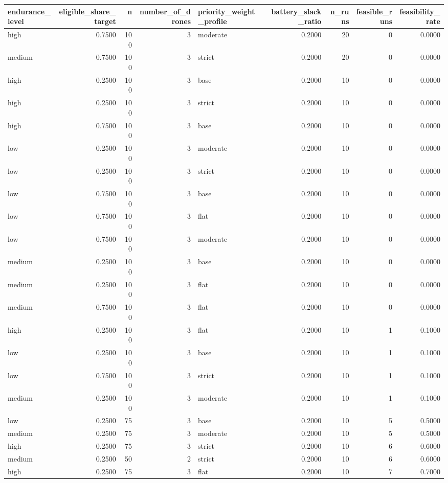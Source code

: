 \begin{tabular}{lrrrlrrrr}
\toprule
endurance_level & eligible_share_target & n & number_of_drones & priority_weight_profile & battery_slack_ratio & n_runs & feasible_runs & feasibility_rate \\
\midrule
high & 0.7500 & 100 & 3 & moderate & 0.2000 & 20 & 0 & 0.0000 \\
medium & 0.7500 & 100 & 3 & strict & 0.2000 & 20 & 0 & 0.0000 \\
high & 0.2500 & 100 & 3 & base & 0.2000 & 10 & 0 & 0.0000 \\
high & 0.2500 & 100 & 3 & strict & 0.2000 & 10 & 0 & 0.0000 \\
high & 0.7500 & 100 & 3 & base & 0.2000 & 10 & 0 & 0.0000 \\
low & 0.2500 & 100 & 3 & moderate & 0.2000 & 10 & 0 & 0.0000 \\
low & 0.2500 & 100 & 3 & strict & 0.2000 & 10 & 0 & 0.0000 \\
low & 0.7500 & 100 & 3 & base & 0.2000 & 10 & 0 & 0.0000 \\
low & 0.7500 & 100 & 3 & flat & 0.2000 & 10 & 0 & 0.0000 \\
low & 0.7500 & 100 & 3 & moderate & 0.2000 & 10 & 0 & 0.0000 \\
medium & 0.2500 & 100 & 3 & base & 0.2000 & 10 & 0 & 0.0000 \\
medium & 0.2500 & 100 & 3 & flat & 0.2000 & 10 & 0 & 0.0000 \\
medium & 0.7500 & 100 & 3 & flat & 0.2000 & 10 & 0 & 0.0000 \\
high & 0.2500 & 100 & 3 & flat & 0.2000 & 10 & 1 & 0.1000 \\
low & 0.2500 & 100 & 3 & base & 0.2000 & 10 & 1 & 0.1000 \\
low & 0.7500 & 100 & 3 & strict & 0.2000 & 10 & 1 & 0.1000 \\
medium & 0.2500 & 100 & 3 & moderate & 0.2000 & 10 & 1 & 0.1000 \\
low & 0.2500 & 75 & 3 & base & 0.2000 & 10 & 5 & 0.5000 \\
medium & 0.2500 & 75 & 3 & moderate & 0.2000 & 10 & 5 & 0.5000 \\
high & 0.2500 & 75 & 3 & strict & 0.2000 & 10 & 6 & 0.6000 \\
medium & 0.2500 & 50 & 2 & strict & 0.2000 & 10 & 6 & 0.6000 \\
high & 0.2500 & 75 & 3 & flat & 0.2000 & 10 & 7 & 0.7000 \\

\end{tabular}
